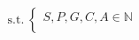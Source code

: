 \documentclass[preview]{standalone}
\begin{document}
\begin{align*}
\text{s.t.}~\begin{cases} S, P, G, C, A \in \mathbb{N} \\ \end{cases}
\end{align*}
\end{document}
